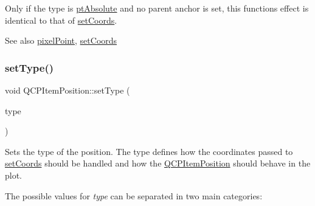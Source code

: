 Only if the type is \mbox{\hyperlink{class_q_c_p_item_position_aad9936c22bf43e3d358552f6e86dbdc8a564f5e53e550ead1ec5fc7fc7d0b73e0}{pt\+Absolute}} and no parent anchor is set, this function\textquotesingle{}s effect is identical to that of \mbox{\hyperlink{class_q_c_p_item_position_aa988ba4e87ab684c9021017dcaba945f}{set\+Coords}}.

\begin{DoxySeeAlso}{See also}
\mbox{\hyperlink{class_q_c_p_item_position_a6cad070c22801295231f5bd6045afe70}{pixel\+Point}}, \mbox{\hyperlink{class_q_c_p_item_position_aa988ba4e87ab684c9021017dcaba945f}{set\+Coords}} 
\end{DoxySeeAlso}
\mbox{\label{class_q_c_p_item_position_aa476abf71ed8fa4c537457ebb1a754ad}} 
\subsubsection{\texorpdfstring{set\+Type()}{setType()}}
{\footnotesize\ttfamily void Q\+C\+P\+Item\+Position\+::set\+Type (\begin{DoxyParamCaption}\item[{\mbox{\hyperlink{class_q_c_p_item_position_aad9936c22bf43e3d358552f6e86dbdc8}{Q\+C\+P\+Item\+Position\+::\+Position\+Type}}}]{type }\end{DoxyParamCaption})}

Sets the type of the position. The type defines how the coordinates passed to \mbox{\hyperlink{class_q_c_p_item_position_aa988ba4e87ab684c9021017dcaba945f}{set\+Coords}} should be handled and how the \mbox{\hyperlink{class_q_c_p_item_position}{Q\+C\+P\+Item\+Position}} should behave in the plot.

The possible values for {\itshape type} can be separated in two main categories\+:

